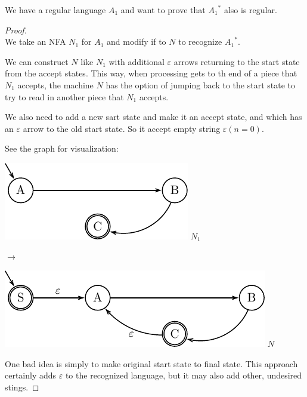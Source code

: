 \begin{example}
    We have a regular language $A_1$ and want to prove that ${A_1}^*$ also is regular.
    \begin{proof} \ \\
        We take an NFA $N_1$ for $A_1$ and modify if to $N$ to recognize ${A_1}^*$.

        We can construct $N$ like $N_1$ with additional $\varepsilon$ arrows returning to
        the start state from the accept states. This way, when processing gets to th end
        of a piece that $N_1$ accepts, the machine $N$ has the option of jumping back to
        the start state to try to read in another piece that $N_1$ accepts.

        We also need to add a new sart state and make it an accept state, and which has an
        $\varepsilon$ arrow to the old start state. So it accept empty string $\varepsilon
        (n = 0)$.
        
        See the graph for visualization:
        \begin{center}
            \begin{minipage}{2.5cm}
                \includegraphics[width=\textwidth]{pics/mp/nfa-7.pdf}
                \center $N_1$
            \end{minipage}
            \; $\longrightarrow$ \;
            \begin{minipage}{3.5cm}
                \includegraphics[width=\textwidth]{pics/mp/nfa-8.pdf}
                \center $N$
            \end{minipage}
        \end{center}

        One bad idea is simply to make original start state to final state. This approach
        certainly adds $\varepsilon$ to the recognized language, but it may also add
        other, undesired stings.

    \end{proof}
\end{example}

